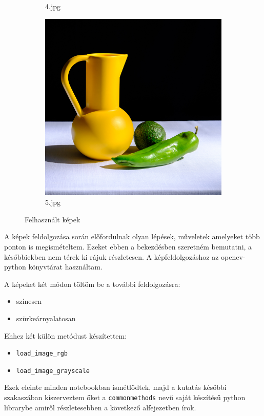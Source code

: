 \begin{figure}[htb]
\begin{subfigure}{0.25\textwidth}
  \caption*{4.jpg}
  \label{fig:4jpg}
\end{subfigure}\hfil %
\begin{subfigure}{0.25\textwidth}
  \includegraphics[width=\linewidth]{../images/5.jpg}
  \caption*{5.jpg}
  \label{fig:5jpg}
\end{subfigure}
\caption{Felhasznált képek}
\label{fig:images}
\end{figure}


A képek feldolgozása során előfordulnak olyan lépések, műveletek amelyeket több ponton is megismételtem. Ezeket ebben a bekezdésben szeretném bemutatni, a későbbiekben nem térek ki rájuk részletesen.
A képfeldolgozáshoz az opencv-python könyvtárat használtam.


A képeket két módon töltöm be a további feldolgozásra:
\begin{itemize}
\item színesen
\item szürkeárnyalatosan
\end{itemize}
Ehhez két külön metódust készítettem:
\begin{itemize}
\item \texttt{load\_image\_rgb}
\item \texttt{load\_image\_grayscale}
\end{itemize}
Ezek eleinte minden notebookban ismétlődtek, majd a kutatás későbbi szakaszában kiszerveztem őket a \texttt{commonmethods} nevű saját készítésű python librarybe amiről részletesebben a következő alfejezetben írok.

